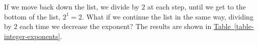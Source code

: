 \documentclass[10pt,]{book}
\theoremstyle{plain}
\theoremstyle{definition}
\theoremstyle{definition}
\theoremstyle{definition}
\theoremstyle{definition}
\theoremstyle{definition}
\numberwithin{equation}{section}
\newcommand{\hrulethin}  {\noalign{\hrule height 0.04em}}
\newcounter{figstack}
\newlength\fight
\newcommand\pushValignCaptionBottom[5][b]{%
\stepcounter{figstack}%
\expandafter\def\csname %
figalign\romannumeral\value{figstack}\endcsname{#1}%
\expandafter\def\csname %
figtype\romannumeral\value{figstack}\endcsname{#2}%
\expandafter\def\csname %
figwd\romannumeral\value{figstack}\endcsname{#3}%
\expandafter\def\csname %
figcontent\romannumeral\value{figstack}\endcsname{#4}%
\expandafter\def\csname %
figcap\romannumeral\value{figstack}\endcsname{#5}%
\setbox0=\hbox{%
\begin{#2}{#3}#4\end{#2}}%
\ifdim\dimexpr\ht0+\dp0\relax>\fight\global\setlength{\fight}{%
\dimexpr\ht0+\dp0\relax}\fi%
}
\begin{document}
    If we move back down the list, we divide by \(2\) at each step, until we get to the bottom of the list, \(2^{1} = 2\). What if we continue the list in the same way, dividing by \(2\) each time we decrease the exponent? The results are shown in \hyperref[table-integer-exponents]{Table~\ref{table-integer-exponents}}.
%
\leavevmode%
\end{document}
